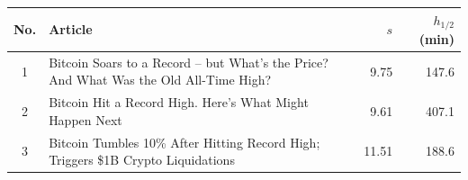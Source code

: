 \begin{tabular}{cp{9cm}rr}
\toprule
No. & Article & $s$ & $h_{1/2}$ (min) \\
\midrule
1 & Bitcoin Soars to a Record -- but What's the Price? And What Was the Old All-Time High? & 9.75 & 147.6 \\
2 & Bitcoin Hit a Record High. Here's What Might Happen Next & 9.61 & 407.1 \\
3 & Bitcoin Tumbles 10\% After Hitting Record High; Triggers \$1B Crypto Liquidations & 11.51 & 188.6 \\
\bottomrule
\end{tabular}

